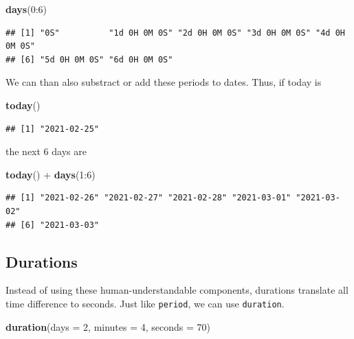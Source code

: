 \documentclass[]{tufte-book}
\newenvironment{Shaded}{}{}
\newcommand{\DataTypeTok}[1]{\textcolor[rgb]{0.56,0.13,0.00}{#1}}
\newcommand{\DecValTok}[1]{\textcolor[rgb]{0.25,0.63,0.44}{#1}}
\newcommand{\KeywordTok}[1]{\textcolor[rgb]{0.00,0.44,0.13}{\textbf{#1}}}
\newcommand{\NormalTok}[1]{#1}
\newcommand{\OperatorTok}[1]{\textcolor[rgb]{0.40,0.40,0.40}{#1}}
\newcommand{\StringTok}[1]{\textcolor[rgb]{0.25,0.44,0.63}{#1}}
\begin{document}
\begin{Shaded}
\begin{Highlighting}[]
\KeywordTok{days}\NormalTok{(}\DecValTok{0}\OperatorTok{:}\DecValTok{6}\NormalTok{)}
\end{Highlighting}
\end{Shaded}

\begin{verbatim}
## [1] "0S"          "1d 0H 0M 0S" "2d 0H 0M 0S" "3d 0H 0M 0S" "4d 0H 0M 0S"
## [6] "5d 0H 0M 0S" "6d 0H 0M 0S"
\end{verbatim}

We can than also substract or add these periods to dates. Thus, if today is

\begin{Shaded}
\begin{Highlighting}[]
\KeywordTok{today}\NormalTok{()}
\end{Highlighting}
\end{Shaded}

\begin{verbatim}
## [1] "2021-02-25"
\end{verbatim}

the next 6 days are

\begin{Shaded}
\begin{Highlighting}[]
\KeywordTok{today}\NormalTok{() }\OperatorTok{+}\StringTok{ }\KeywordTok{days}\NormalTok{(}\DecValTok{1}\OperatorTok{:}\DecValTok{6}\NormalTok{)}
\end{Highlighting}
\end{Shaded}

\begin{verbatim}
## [1] "2021-02-26" "2021-02-27" "2021-02-28" "2021-03-01" "2021-03-02"
## [6] "2021-03-03"
\end{verbatim}

\hypertarget{durations}{%
\subsection{Durations}\label{durations}}

Instead of using these human-understandable components, durations translate all time difference to seconds. Just like \texttt{period}, we can use \texttt{duration}.

\begin{Shaded}
\begin{Highlighting}[]
\KeywordTok{duration}\NormalTok{(}\DataTypeTok{days =} \DecValTok{2}\NormalTok{, }\DataTypeTok{minutes =} \DecValTok{4}\NormalTok{, }\DataTypeTok{seconds =} \DecValTok{70}\NormalTok{)}
\end{Highlighting}
\end{Shaded}
\end{document}
